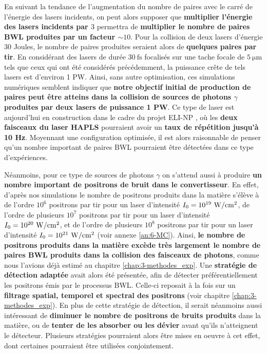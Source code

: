 \begin{refsection}
En suivant la tendance de l'augmentation du nombre de paires avec le carré de l'énergie des lasers incidents, on peut alors supposer que \textbf{multiplier l'énergie des lasers incidents par $3$} permettra de \textbf{multiplier le nombre de paires BWL produites par un facteur $\sim 10$}. Pour la collision de deux lasers d'énergie 30 Joules, le nombre de paires produites seraient alors de \textbf{quelques paires par tir}. En considérant des lasers de durée $30 ~ \si{\fs}$ focalisés sur une tache focale de $5 ~ \si{\um}$ tels que ceux qui ont été considérés précédemment, la puissance crête de tels lasers est d'environ 1 PW. Ainsi, sans autre optimisation, ces simulations numériques semblent indiquer que \textbf{notre objectif initial de production de paires peut être atteins dans la collision de sources de photons $\gamma$ produites par deux lasers de puissance 1 PW}. Ce type de laser est aujourd'hui en construction dans le cadre du projet ELI-NP \parencite{tanaka_2020}, où les \textbf{deux faisceaux du laser HAPLS} \parencite{laser_hapls} pourraient avoir un \textbf{taux de répétition jusqu'à 10 Hz}. Moyennant une configuration optimisée, il est alors raisonnable de penser qu'un nombre important de paires BWL pourraient être détectées dans ce type d'expériences.

Néanmoins, pour ce type de sources de photons $\gamma$ on s'attend aussi à produire \textbf{un nombre important de positrons de bruit dans le convertisseur}. En effet, d'après nos simulations le nombre de positrons produits dans la matière s'élève à de l'ordre $10^6$ positrons par tir pour un laser d'intensité $I_0=10^{19} ~ \rm W/cm^2$, de l'ordre de plusieurs $10^7$ positrons par tir pour un laser d'intensité $I_0=10^{20} ~ \rm W/cm^2$, et de l'ordre de plusieurs $10^8$ positrons par tir pour un laser d'intensité $I_0=10^{21} ~ \rm W/cm^2$ (voir annexe \ref{an:6-MC}). Ainsi, \textbf{le nombre de positrons produits dans la matière excède très largement le nombre de paires BWL produits dans la collision des faisceaux de photons}, comme nous l'avions déjà estimé au chapitre \ref{chap:3-methodes_exp}. Une \textbf{stratégie de détection adaptée} avait alors été présentée, afin de détecter préférentiellement les positrons émis par le processus BWL. Celle-ci reposait à la fois sur un \textbf{filtrage spatial, temporel et spectral des positrons} (voir chapitre \ref{chap:3-methodes_exp}). 
En plus de cette stratégie de détection, il serait néanmoins aussi intéressant de \textbf{diminuer le nombre de positrons de bruits produits} dans la matière, ou de \textbf{tenter de les absorber ou les dévier} avant qu'ils n'atteignent le détecteur. Plusieurs stratégies pourraient alors être mises en oeuvre à cet effet, dont certaines pourraient être utilisées conjointement.


\end{refsection}
